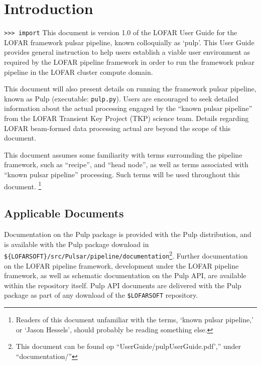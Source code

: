 \documentclass[a4paper,10pt,bibtotoc]{scrartcl}
\begin{document}
\section{Introduction}
\label{sec:introduction}
\verb|>>> import| This document is version 1.0 of the LOFAR User Guide for the LOFAR
framework pulsar pipeline, known colloquially as `pulp'.  This User
Guide provides general instruction to help users establish a viable user environment
as required by the LOFAR pipeline framework in order to run
the framework pulsar pipeline in the LOFAR cluster compute domain.

This document will also present details on running the
framework pulsar pipeline, known as Pulp (executable: \verb|pulp.py|).
Users are encouraged to seek detailed information about the
actual processing engaged by the ``known pulsar pipeline'' from the
LOFAR Transient Key Project (TKP) science team. Details
regarding LOFAR beam-formed data processing actual are beyond the scope of this
document.

This document assumes some familiarity with terms surrounding the pipeline
framework, such as ``recipe'',  and ``head node'', as well as terms
associated with ``known pulsar pipeline'' processing. Such terms will
be used throughout this document. \footnote{Readers of this
  document unfamiliar with the terms, `known pulsar
  pipeline,'  or `Jason Hessels', should probably be reading something else.}

\subsection{Applicable Documents}
Documentation on the Pulp package is provided with the Pulp
distribution, and is available with the Pulp package download in
\verb|${LOFARSOFT}/src/Pulsar/pipeline/documentation|\footnote{This
  document can be found op ``UserGuide/pulpUserGuide.pdf','' under
  ``documentation/''}. Further documentation on the LOFAR pipeline
framework, development under the LOFAR pipeline framework,  as well as schematic
documentation on the Pulp API, are available within the repository
itself. Pulp API documents are delivered with the Pulp package as
part of any download of the \verb|$LOFARSOFT| repository.
\end{document}
